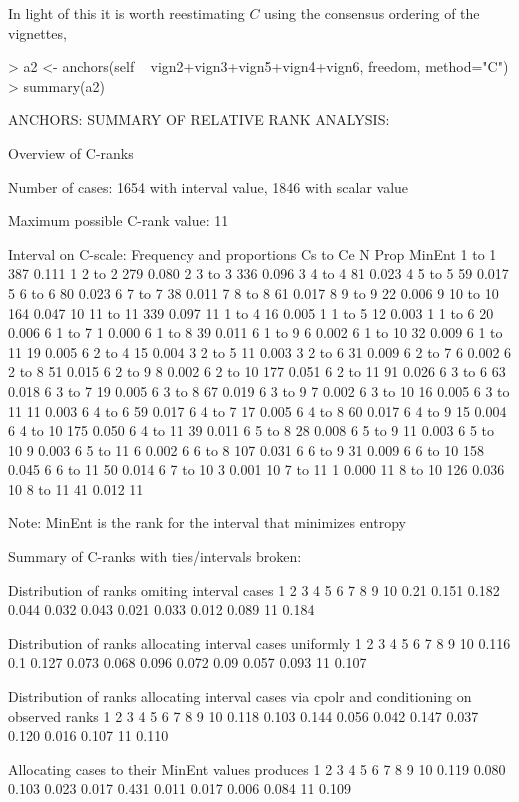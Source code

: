 \documentclass{amsart}
\begin{document}
In light of this it is worth reestimating $C$ using the consensus
ordering of the vignettes,
\begin{Schunk}
\begin{Sinput}
> a2 <- anchors(self ~ vign2+vign3+vign5+vign4+vign6, freedom, method="C")
> summary(a2)
\end{Sinput}
\begin{Soutput}
ANCHORS: SUMMARY OF RELATIVE RANK ANALYSIS:

Overview of C-ranks

Number of cases: 1654 with interval value, 1846 with scalar value

Maximum possible C-rank value: 11

Interval on C-scale: Frequency and proportions Cs to Ce
           N  Prop MinEnt
 1 to  1 387 0.111      1
 2 to  2 279 0.080      2
 3 to  3 336 0.096      3
 4 to  4  81 0.023      4
 5 to  5  59 0.017      5
 6 to  6  80 0.023      6
 7 to  7  38 0.011      7
 8 to  8  61 0.017      8
 9 to  9  22 0.006      9
10 to 10 164 0.047     10
11 to 11 339 0.097     11
 1 to  4  16 0.005      1
 1 to  5  12 0.003      1
 1 to  6  20 0.006      6
 1 to  7   1 0.000      6
 1 to  8  39 0.011      6
 1 to  9   6 0.002      6
 1 to 10  32 0.009      6
 1 to 11  19 0.005      6
 2 to  4  15 0.004      3
 2 to  5  11 0.003      3
 2 to  6  31 0.009      6
 2 to  7   6 0.002      6
 2 to  8  51 0.015      6
 2 to  9   8 0.002      6
 2 to 10 177 0.051      6
 2 to 11  91 0.026      6
 3 to  6  63 0.018      6
 3 to  7  19 0.005      6
 3 to  8  67 0.019      6
 3 to  9   7 0.002      6
 3 to 10  16 0.005      6
 3 to 11  11 0.003      6
 4 to  6  59 0.017      6
 4 to  7  17 0.005      6
 4 to  8  60 0.017      6
 4 to  9  15 0.004      6
 4 to 10 175 0.050      6
 4 to 11  39 0.011      6
 5 to  8  28 0.008      6
 5 to  9  11 0.003      6
 5 to 10   9 0.003      6
 5 to 11   6 0.002      6
 6 to  8 107 0.031      6
 6 to  9  31 0.009      6
 6 to 10 158 0.045      6
 6 to 11  50 0.014      6
 7 to 10   3 0.001     10
 7 to 11   1 0.000     11
 8 to 10 126 0.036     10
 8 to 11  41 0.012     11

Note: MinEnt is the rank for the interval that minimizes entropy

Summary of C-ranks with ties/intervals broken:

Distribution of ranks omiting interval cases
    1     2     3     4     5     6     7     8     9    10
 0.21 0.151 0.182 0.044 0.032 0.043 0.021 0.033 0.012 0.089
    11
 0.184

Distribution of ranks allocating interval cases uniformly
     1   2     3     4     5     6     7    8     9    10
 0.116 0.1 0.127 0.073 0.068 0.096 0.072 0.09 0.057 0.093
    11
 0.107

Distribution of ranks allocating interval cases via cpolr
and conditioning on observed ranks
    1     2     3     4     5     6     7     8     9    10 
0.118 0.103 0.144 0.056 0.042 0.147 0.037 0.120 0.016 0.107 
   11 
0.110 

Allocating cases to their MinEnt values produces
    1     2     3     4     5     6     7     8     9    10 
0.119 0.080 0.103 0.023 0.017 0.431 0.011 0.017 0.006 0.084 
   11 
0.109 
\end{Soutput}
\end{Schunk}
\end{document}
